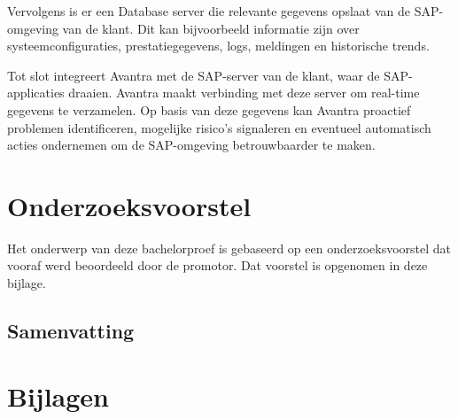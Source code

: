 \documentclass[dutch,dit,thesis]{hogentreport}
\begin{document}
Vervolgens is er een Database server die relevante gegevens opslaat van de SAP-omgeving van de klant. Dit kan bijvoorbeeld informatie zijn over systeemconfiguraties, prestatiegegevens, logs, meldingen en historische trends. 

Tot slot integreert Avantra met de SAP-server van de klant, waar de SAP-applicaties draaien. Avantra maakt verbinding met deze server om real-time gegevens te verzamelen.
Op basis van deze gegevens kan Avantra proactief problemen identificeren, mogelijke risico's signaleren en eventueel automatisch acties ondernemen om de SAP-omgeving betrouwbaarder te maken.









\appendix

\chapter{Onderzoeksvoorstel}

Het onderwerp van deze bachelorproef is gebaseerd op een onderzoeksvoorstel dat vooraf werd beoordeeld door de promotor. Dat voorstel is opgenomen in deze bijlage.




\section*{Samenvatting}






%

\chapter{Bijlagen}
\end{document}
